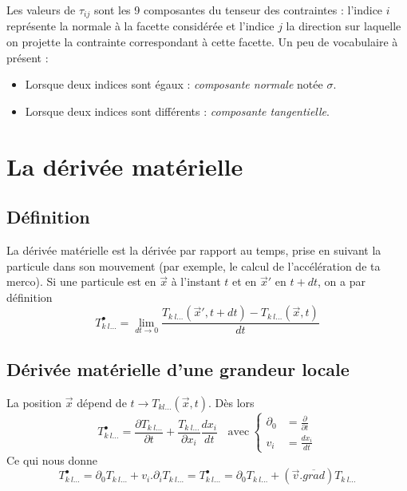 Les valeurs de $\tau_{ij}$ sont les 9 composantes du tenseur des contraintes : l'indice $i$ représente
la normale à la facette considérée et l'indice $j$ la direction sur laquelle on projette la contrainte
correspondant à cette facette. Un peu de vocabulaire à présent :
\begin{itemize}
	\item Lorsque deux indices sont égaux : \textit{composante normale} notée $\sigma$.
	\item Lorsque deux indices sont différents : \textit{composante tangentielle}.
\end{itemize}
    
    
    
    
\section{La dérivée matérielle}
\subsection{Définition}
La dérivée matérielle est la dérivée par rapport au temps, prise en suivant la particule dans son 
mouvement (par exemple, le calcul de l'accélération de ta merco). Si une particule est en $\vec{x}$
à l'instant $t$ et en $\vec{x}'$ en $t+dt$, on a par définition
\begin{equation}
	T_{k\ l\dots}^\bullet = \lim\limits_{dt \rightarrow 0} \dfrac{T_{k\ l\dots}(\vec{x}',t+dt) - T_{k\ l\dots}
		(\vec x,t)}{dt}
\end{equation}
    
\subsection{Dérivée matérielle d'une grandeur locale}
La position $\vec{x}$ dépend de $t \rightarrow T_{kl\dots} (\vec{x},t)$. Dès lors
\begin{equation}
	T_{k\ l\dots}^\bullet = \frac{\partial T_{k\ l\dots}}{\partial t} + \frac{T_{k\ l\dots}}{\partial x_i}
	\frac{dx_i}{dt}\ \ \ \ \text{avec}\ \left\{\begin{array}{ll}
	\partial_0 &= \frac{\partial}{\partial t}  \\
	v_i &= \frac{dx_i}{dt} 
	\end{array}\right.
\end{equation}
Ce qui nous donne 
\begin{equation}
	T_{k\ l\dots}^\bullet = \partial_0T_{k\ l\dots} + v_i.\partial_iT_{k\ l\dots} = T_{k\ l\dots}^\bullet = \partial_0T_{k\ l\dots} +
	(\vec v.\overline{grad})T_{k\ l\dots}
\end{equation}
    

